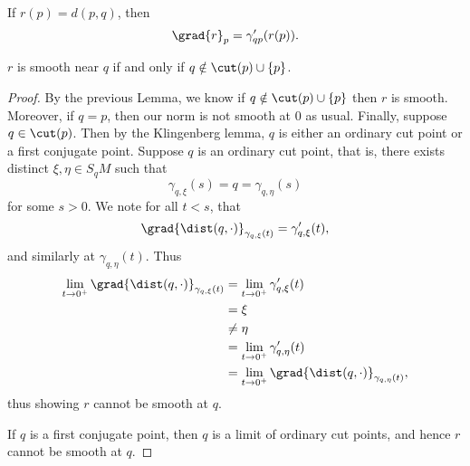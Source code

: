 \begin{cor}
    If $r(p)=d(p,q)$, then
    $$\grad{r}_p=\gamma_{qp}'(r(p)).$$
\end{cor}


\begin{lem}
    $r$ is smooth near $q$ if and only if $q\notin\cut(p)\cup\{p\}$.
\end{lem}

\begin{proof}
By the previous Lemma, we know if $q\notin\cut(p)\cup\{p\}$ then $r$ is smooth.  Moreover, if $q=p$, then our norm is not smooth at $0$ as usual.  Finally, suppose $q\in\cut(p)$.  Then by the Klingenberg lemma, $q$ is either an ordinary cut point or a first conjugate point.  Suppose $q$ is an ordinary cut point, that is, there exists distinct $\xi,\eta\in S_qM$ such that
$$\gamma_{q,\xi}(s)=q=\gamma_{q,\eta}(s)$$
for some $s>0$.  We note for all $t<s$, that
$$\grad{\dist(q,\cdot)}_{\gamma_{q,\xi}(t)}=\gamma_{q,\xi}'(t),$$
and similarly at $\gamma_{q,\eta}(t)$.  Thus
\begin{align*}
	\lim_{t\to0^+}\grad{\dist(q,\cdot)}_{\gamma_{q,\xi}(t)}&=\lim_{t\to0^+}\gamma_{q,\xi}'(t)\\
	&=\xi\\
	&\neq\eta\\
	&=\lim_{t\to0^+}\gamma_{q,\eta}'(t)\\
	&=\lim_{t\to0^+}\grad{\dist(q,\cdot)}_{\gamma_{q,\eta}(t)},
\end{align*}
thus showing $r$ cannot be smooth at $q$.

If $q$ is a first conjugate point, then $q$ is a limit of ordinary cut points, and hence $r$ cannot be smooth at $q$.
\end{proof}
























